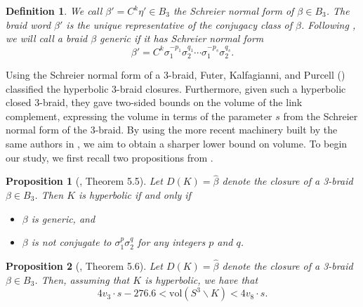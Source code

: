\documentclass{article}
\newtheorem{definition}{Definition}[section]
\newtheorem{proposition}{Proposition}[section]
\begin{document}
\begin{definition} We call $\beta'=C^{k}\eta' \in B_{3}$ the \emph{Schreier normal form} of $\beta \in B_{3}$. The braid word $\beta'$ is the unique representative of the conjugacy class of $\beta$. Following \cite{Cusp}, we will call a braid $\beta$ \emph{generic} if it has Schreier normal form 
$$\beta'=C^{k}\sigma_{1}^{-p_{1}}\sigma_{2}^{q_{1}}\cdots \sigma_{1}^{-p_{s}}\sigma_{2}^{q_{s}}.$$ 
\end{definition}

Using the Schreier normal form of a 3-braid, Futer, Kalfagianni, and Purcell (\cite{Cusp}) classified the hyperbolic 3-braid closures. Furthermore, given such a hyperbolic closed 3-braid, they gave two-sided bounds on the volume of the link complement, expressing the volume in terms of the parameter $s$ from the Schreier normal form of the 3-braid. By using the more recent machinery built by the same authors in \cite{Guts}, we aim to obtain a sharper lower bound on volume. To begin our study, we first recall two propositions from \cite{Cusp}. 

\begin{proposition}[\cite{Cusp}, Theorem 5.5] Let $D(K)=\widehat{\beta}$ denote the closure of a 3-braid $\beta \in B_{3}$. Then $K$ is hyperbolic if and only if 
\begin{itemize}
\item[(1)] $\beta$ is generic, and 
\item[(2)] $\beta$ is not conjugate to $\sigma_{1}^p\sigma_{2}^q$ for any integers $p$ and $q$. 
\end{itemize}
\label{hypgeneric}
\end{proposition}

\begin{proposition}[\cite{Cusp}, Theorem 5.6]\label{svolbound}
Let $D(K)=\widehat{\beta}$ denote the closure of a 3-braid $\beta \in B_{3}$. Then, assuming that $K$ is hyperbolic, we have that
$$4v_{3}\cdot s-276.6 < \mathrm{vol}(S^3 \backslash K) < 4v_{8}\cdot s.$$ 
\end{proposition}
\end{document}
